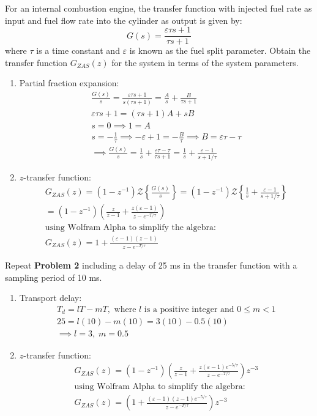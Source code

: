 \documentclass[12pt]{article}
\newenvironment{problem}[2][Problem]{\begin{trivlist}
\item[\hskip \labelsep {\bfseries #1}\hskip \labelsep {\bfseries #2.}]}{\end{trivlist}}
\begin{document}
\pagebreak
\begin{problem}{2}
  For an internal combustion engine, the transfer function with injected fuel rate as input and fuel flow rate into the cylinder as output is given by:
  $$G(s) = \frac{\varepsilon\tau s + 1}{\tau s + 1}$$
  where $\tau$ is a time constant and $\varepsilon$ is known as the fuel split parameter. Obtain the transfer function $G_{ZAS}(z)$ for the system in terms of the system parameters.
  \begin{enumerate}[label=\alph*.]
    \item Partial fraction expansion:
    \begin{align*}
      \frac{G(s)}{s} =\frac{\varepsilon\tau s + 1}{s(\tau s + 1)} = \frac{A}{s}+\frac{B}{\tau s+1}\\
      \varepsilon\tau s + 1 = (\tau s+1)A + sB\\
      s=0\implies 1 = A\\
      s=-\frac{1}{\tau} \implies -\varepsilon + 1= -\frac{B}{\tau} \implies B = \varepsilon\tau - \tau\\
      \implies \frac{G(s)}{s} = \frac{1}{s} + \frac{\varepsilon\tau-\tau}{\tau s + 1} = \frac{1}{s} + \frac{\varepsilon - 1}{s + 1/\tau}
    \end{align*} 
    \item $z$-transfer function:
    \begin{align*}
      G_{ZAS}(z) = (1-z^{-1})\mathcal{Z}\left\{\frac{G(s)}{s}\right\}=(1-z^{-1})\mathcal{Z}\left\{\frac{1}{s} + \frac{\varepsilon - 1}{s + 1/\tau}\right\}\\
      = (1-z^{-1})\left(\frac{z}{z-1}+\frac{z(\varepsilon-1)}{z-e^{-T/\tau}}\right)\\
      \text{using Wolfram Alpha to simplify the algebra:}\\
      G_{ZAS}(z)=1+\frac{(\varepsilon-1)(z-1)}{z-e^{-T/\tau}}
    \end{align*} 
\end{enumerate}
\end{problem}
\pagebreak
\begin{problem}{3}
Repeat \textbf{Problem 2} including a delay of 25 ms in the transfer function with a sampling period of 10 ms.
\begin{enumerate}[label=\alph*.]
  \item Transport delay:
  \begin{align*}
    T_d = lT - mT, \text{ where $l$ is a positive integer and $0\leq m < 1$}\\
    25 = l(10) - m(10) = 3(10) - 0.5(10)\\
    \implies l=3,\; m=0.5
  \end{align*} 
  \item $z$-transfer function:
  \begin{align*}
    G_{ZAS}(z) = (1-z^{-1})\left(\frac{z}{z-1} + \frac{z(\varepsilon-1)e^{-5/\tau}}{z-e^{-T/\tau}}\right)z^{-3}\\
    \text{using Wolfram Alpha to simplify the algebra:}\\
    G_{ZAS}(z)=\left(1+\frac{(\varepsilon-1)(z-1)e^{-5/\tau}}{z-e^{-T/\tau}}\right)z^{-3}
  \end{align*} 
\end{enumerate}
\end{problem}
\end{document}
